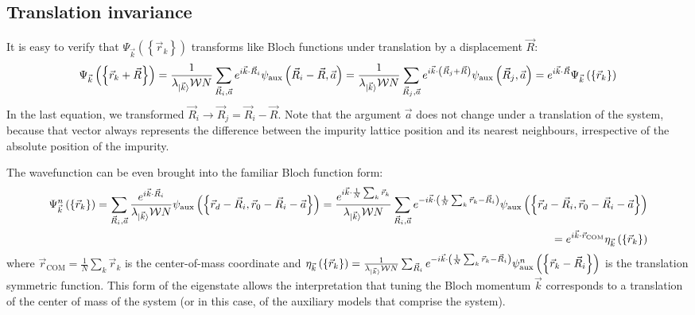 \documentclass{report}
\numberwithin{equation}{section}
\begin{document}
\begin{appendices}
\section{Translation invariance}
It is easy to verify that \(\Psi_{\vec k}\left(\left\{ \vec r_k \right\}  \right) \) transforms like Bloch functions under translation by a displacement \(\vec R\):
\begin{equation}\begin{aligned}
	\Psi_{\vec k}\left(\left\{\vec r_k + \vec R\right\} \right) = \frac{1}{\lambda_{\ket{\vec k}} \mathcal{W} N}\sum_{\vec R_i,\vec a} e^{i \vec{k}\cdot\vec{R}_i} \psi_\text{aux}\left(\vec R_i - \vec R, \vec a\right) = \frac{1}{\lambda_{\ket{\vec k}} \mathcal{W} N}\sum_{\vec R_j, \vec a} e^{i \vec{k}\cdot\left(\vec{R}_j + \vec R\right)} \psi_\text{aux}\left(\vec R_j, \vec a\right) = e^{i \vec{k}\cdot\vec{R}} \Psi_{\vec k}\left(\left\{ \vec r_k \right\} \right)
\end{aligned}\end{equation}
In the last equation, we transformed \(\vec R_i \to \vec R_j = \vec R_i - \vec R\). Note that the argument \(\vec a\) does not change under a translation of the system, because that vector always represents the difference between the impurity lattice position and its nearest neighbours, irrespective of the absolute position of the impurity.

The wavefunction can be even brought into the familiar Bloch function form:
\begin{equation}\begin{aligned}
	\Psi^n_{\vec k}\left(\left\{\vec r_k\right\}\right) = \sum_{\vec R_i, \vec a} \frac{e^{i \vec{k}\cdot\vec{R}_i}}{\lambda_{\ket{\vec k}} \mathcal{W} N} \psi_\text{aux}\left(\left\{ \vec r_d - \vec R_i, \vec r_0 - \vec R_i - \vec a \right\} \right) = \frac{e^{i \vec{k}\cdot\frac{1}{N}\sum_k \vec{r}_k}}{\lambda_{\ket{\vec k}} \mathcal{W} N}\sum_{\vec R_i, \vec a} e^{-i \vec{k}\cdot\left(\frac{1}{N}\sum_k\vec r_k - \vec{R}_i\right)} \psi_\text{aux}\left(\left\{ \vec r_d - \vec R_i, \vec r_0 - \vec R_i - \vec a \right\} \right) \\
	= e^{i \vec{k}\cdot\vec{r}_\text{COM}} \eta_{\vec k}\left(\left\{\vec r_k\right\}\right)
\end{aligned}\end{equation}
where \(\vec r_\text{COM} = \frac{1}{N}\sum_k \vec r_k\) is the center-of-mass coordinate and \(\eta_{\vec k}\left(\left\{\vec r_k\right\}\right) = \frac{1}{\lambda_{\ket{\vec k}} \mathcal{W} N}\sum_{\vec R_i} e^{-i \vec{k}\cdot\left(\frac{1}{N}\sum_k\vec r_k - \vec{R}_i\right)} \psi^n_\text{aux}\left(\left\{\vec r_k - \vec R_i\right\}\right)\) is the translation symmetric function. This form of the eigenstate allows the interpretation that tuning the Bloch momentum \(\vec k\) corresponds to a translation of the center of mass of the system (or in this case, of the auxiliary models that comprise the system).


\end{appendices}
\end{document}
